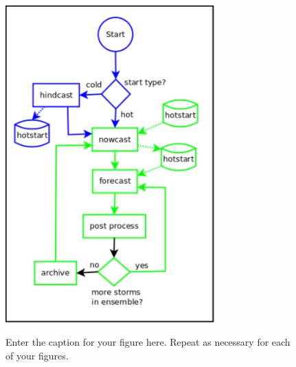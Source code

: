 \documentclass[12pt]{article}
\begin{document}
{}
{\clearpage}




\begin{figure}[t]
  \noindent\includegraphics[width=19pc,angle=0]{asgs_overview_color.pdf}\\
  \caption{Enter the caption for your figure here.  Repeat as
  necessary for each of your figures.\cite{LynchDR2004}}\label{f1}
\end{figure}
\end{document}
